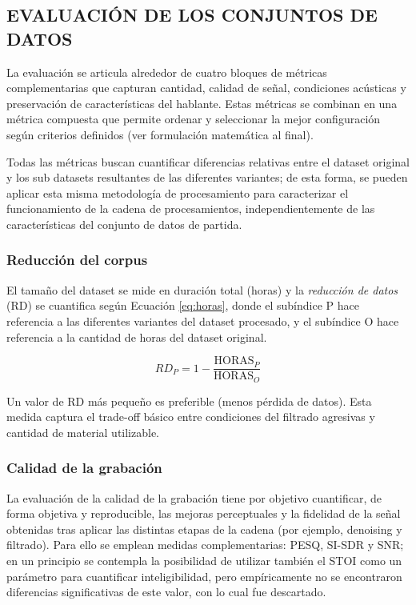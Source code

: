 \subsection{EVALUACIÓN DE LOS CONJUNTOS DE DATOS}

La evaluación se articula alrededor de cuatro bloques de métricas complementarias que capturan cantidad, calidad de señal, condiciones acústicas y preservación de características del hablante. Estas métricas se combinan en una métrica compuesta que permite ordenar y seleccionar la mejor configuración según criterios definidos (ver formulación matemática al final). 

Todas las métricas buscan cuantificar diferencias relativas entre el dataset original y los sub datasets resultantes de las diferentes variantes; de esta forma, se pueden aplicar esta misma metodología de procesamiento para caracterizar el funcionamiento de la cadena de procesamientos, independientemente de las características del conjunto de datos de partida.

\subsubsection{Reducción del corpus}
El tamaño del dataset se mide en duración total (horas) y la \emph{reducción de datos} (RD) se cuantifica según Ecuación \ref{eq:horas}, donde el subíndice P hace referencia a las diferentes variantes del dataset procesado, y el subíndice O hace referencia a la cantidad de horas del dataset original.


\begin{equation}
\label{eq:horas}
RD_P = 1 - \frac{\mathrm{HORAS}_P}{\mathrm{HORAS}_O}
\end{equation}

Un valor de RD más pequeño es preferible (menos pérdida de datos). Esta medida captura el trade-off básico entre condiciones del filtrado agresivas y cantidad de material utilizable. 

\subsubsection{Calidad de la grabación}
La evaluación de la calidad de la grabación tiene por objetivo cuantificar, de forma objetiva y reproducible, las mejoras perceptuales y la fidelidad de la señal obtenidas tras aplicar las distintas etapas de la cadena (por ejemplo, denoising y filtrado). Para ello se emplean medidas complementarias: PESQ, SI-SDR y SNR; en un principio se contempla la posibilidad de utilizar también el STOI como un parámetro para cuantificar inteligibilidad, pero empíricamente no se encontraron diferencias significativas de este valor, con lo cual fue descartado. 

